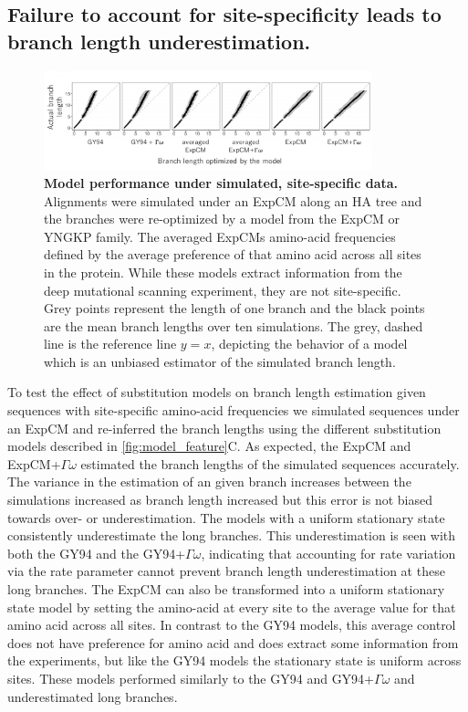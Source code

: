 \documentclass[11pt]{article}
\begin{document}
\subsection*{Failure to account for site-specificity leads to branch length underestimation.}

\begin{figure}[H]
\centerline{\includegraphics[width=0.85\textwidth]{figures/simulations}}
\caption{\label{simulations}
\textbf{Model performance under simulated, site-specific data.} 
Alignments were simulated under an ExpCM along an HA tree and the branches were re-optimized by a model from the ExpCM or YNGKP family. 
The averaged ExpCMs amino-acid frequencies defined by the average preference of that amino acid across all sites in the protein. 
While these models extract information from the deep mutational scanning experiment, they are not site-specific. 
Grey points represent the length of one branch and the black points are the mean branch lengths over ten simulations. 
The grey, dashed line is the reference line $y=x$, depicting the behavior of a model which is an unbiased estimator of the simulated branch length. 
}
\end{figure}

To test the effect of substitution models on branch length estimation given sequences with site-specific amino-acid frequencies we simulated sequences under an ExpCM and re-inferred the branch lengths using the different substitution models described in \ref{fig:model_feature}C.
As expected, the ExpCM and ExpCM+$\Gamma\omega$ estimated the branch lengths of the simulated sequences accurately. 
The variance in the estimation of an given branch increases between the simulations increased as branch length increased but this error is not biased towards over- or underestimation.
The models with a uniform stationary state consistently underestimate the long branches. 
This underestimation is seen with both the GY94 and the GY94+$\Gamma\omega$, indicating that accounting for rate variation via the rate parameter cannot prevent branch length underestimation at these long branches. 
The ExpCM can also be transformed into a uniform stationary state model by setting the amino-acid at every site to the average value for that amino acid across all sites. 
In contrast to the GY94 models, this average control does not have preference for amino acid and does extract some information from the experiments, but like the GY94 models the stationary state is uniform across sites. 
These models performed similarly to the GY94 and GY94+$\Gamma\omega$ and underestimated long branches. 
\end{document}
